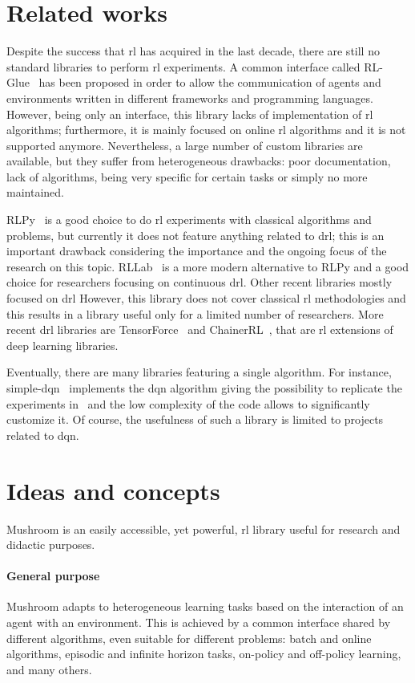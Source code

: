 \section{Related works}
Despite the success that \gls{rl} has acquired in the last decade, there are still no standard libraries to perform \gls{rl} experiments. A common interface called RL-Glue~\cite{tanner2009rl} has been proposed in order to allow the communication of agents and environments written in different frameworks and programming languages. However, being only an interface, this library lacks of implementation of \gls{rl} algorithms; furthermore, it is mainly focused on online \gls{rl} algorithms and it is not supported anymore. Nevertheless, a large number of custom libraries are available, but they suffer from heterogeneous drawbacks: poor documentation, lack of algorithms, being very specific for certain tasks or simply no more maintained.

RLPy~\cite{JMLR:v16:geramifard15a} is a good choice to do \gls{rl} experiments with classical algorithms and problems, but currently it does not feature anything related to \gls{drl}; this is an important drawback considering the importance and the ongoing focus of the research on this topic. RLLab~\cite{duan2016benchmarking} is a more modern alternative to RLPy and a good choice for researchers focusing on continuous \gls{drl}. Other recent libraries mostly focused on \gls{drl} However, this library does not cover classical \gls{rl} methodologies and this results in a library useful only for a limited number of researchers. More recent \gls{drl} libraries are TensorForce~\cite{schaarschmidt2017tensorforce} and ChainerRL~\cite{bworld}, that are \gls{rl} extensions of deep learning libraries.

Eventually, there are many libraries featuring a single algorithm. For instance, simple-dqn~\cite{simpledqn} implements the \gls{dqn} algorithm giving the possibility to replicate the experiments in~\cite{mnih2015human} and the low complexity of the code allows to significantly customize it. Of course, the usefulness of such a library is limited to projects related to \gls{dqn}.

\section{Ideas and concepts}
Mushroom is an easily accessible, yet powerful, \gls{rl} library useful for research and didactic purposes.
\paragraph{General purpose} Mushroom adapts to heterogeneous learning tasks based on the interaction of an agent with an environment. This is achieved by a common interface shared by different algorithms, even suitable for different problems: batch and online algorithms, episodic and infinite horizon tasks, on-policy and off-policy learning, and many others.
